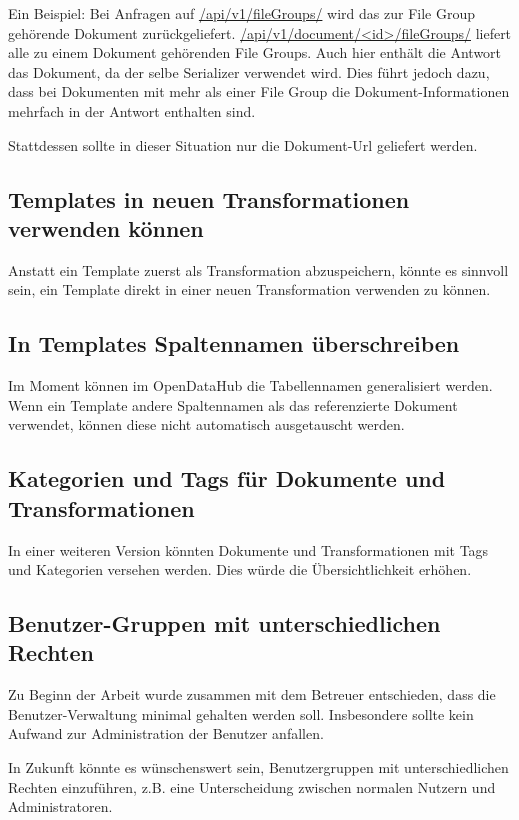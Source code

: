 Ein Beispiel:
Bei Anfragen auf \url{/api/v1/fileGroups/} wird das zur File Group gehörende Dokument zurückgeliefert.
\url{/api/v1/document/<id>/fileGroups/} liefert alle zu einem Dokument gehörenden File Groups. Auch hier enthält die Antwort das Dokument, da der selbe Serializer verwendet wird. Dies führt jedoch dazu, dass bei Dokumenten mit mehr als einer File Group die Dokument-Informationen mehrfach in der Antwort enthalten sind.

Stattdessen sollte in dieser Situation nur die Dokument-Url geliefert werden.

\subsection{Templates in neuen Transformationen verwenden können}
Anstatt ein Template zuerst als Transformation abzuspeichern, könnte es sinnvoll sein, ein Template direkt in einer neuen Transformation verwenden zu können.

\subsection{In Templates Spaltennamen überschreiben}
Im Moment können im OpenDataHub die Tabellennamen generalisiert werden. Wenn ein Template andere Spaltennamen als das referenzierte Dokument verwendet, können diese nicht automatisch ausgetauscht werden.

\subsection{Kategorien und Tags für Dokumente und Transformationen}
In einer weiteren Version könnten Dokumente und Transformationen mit Tags und Kategorien versehen werden. Dies würde die Übersichtlichkeit erhöhen.

\subsection{Benutzer-Gruppen mit unterschiedlichen Rechten}
Zu Beginn der Arbeit wurde zusammen mit dem Betreuer entschieden, dass die Benutzer-Verwaltung minimal gehalten werden soll. Insbesondere sollte kein Aufwand zur Administration der Benutzer anfallen.

In Zukunft könnte es wünschenswert sein, Benutzergruppen mit unterschiedlichen Rechten einzuführen, z.B. eine Unterscheidung zwischen normalen Nutzern und Administratoren.